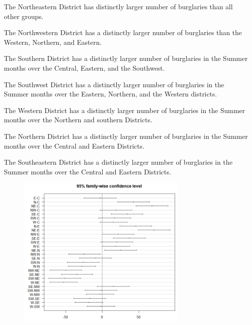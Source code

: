 \documentclass{article}
\begin{document}
\begin{enumerate}

{\setlength\itemindent{25pt}\item The Northeastern District has distinctly larger number of burglaries than all other groups.}
{\setlength\itemindent{25pt}\item The Northwestern District has a distinctly larger number of burglaries than the Western, Northern, and Eastern.}
{\setlength\itemindent{25pt}\item The Southern District has a distinctly larger number of burglaries in the Summer months over the Central, Eastern, and the Southwest.}
{\setlength\itemindent{25pt}\item The Southwest District has a distinctly larger number of burglaries in the Summer months over the Eastern, Northern, and the Western districts.  }
{\setlength\itemindent{25pt}\item The Western District has a distinctly larger number of burglaries in the Summer months over the Northern and southern Districts.}
{\setlength\itemindent{25pt}\item The Northern District has a distinctly larger number of burglaries in the Summer months over the Central and Eastern Districts. } 
{\setlength\itemindent{25pt}\item The Southeastern District has a distinctly larger number of burglaries in the Summer months over the Central and Eastern Districts.}
\end{enumerate} 
\begin{figure}[h]
\centering
\includegraphics[width = 0.75\textwidth]{TukeyHSD.png}
\end{figure}
\end{document}
